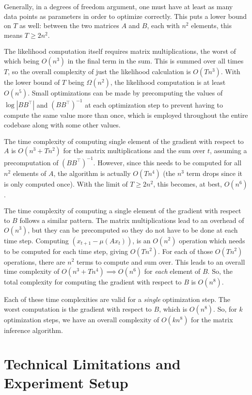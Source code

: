 \documentclass[12pt]{article}
\theoremstyle{definition}
\begin{document}
Generally, in a degrees of freedom argument, one must have at least as many data points as parameters in order to optimize correctly. This puts a lower bound on $T$ as well: between the two matrices $A$ and $B$, each with $n^2$ elements, this means $T \geq 2n^2$.

The likelihood computation itself requires matrix multiplications, the worst of which being $O(n^3)$ in the final term in the sum. This is summed over all times $T$, so the overall complexity of just the likelihood calculation is $O(Tn^3)$. With the lower bound of $T$ being $\Omega(n^2)$, the likelihood computation is at least $O(n^5)$. Small optimizations can be made by precomputing the values of $\log|BB^\top|$ and $(BB^\top)^{-1}$ at each optimization step to prevent having to compute the same value more than once, which is employed throughout the entire codebase along with some other values. 

The time complexity of computing single element of the gradient with respect to $A$ is $O(n^3 + Tn^2)$ for the matrix multiplications and the sum over $t$, assuming a precomputation of $(BB^\top)^{-1}$. However, since this needs to be computed for all $n^2$ elements of $A$, the algorithm is actually $O(Tn^4)$ (the $n^3$ term drops since it is only computed once). With the limit of $T \geq 2n^2$, this becomes, at best, $O(n^6)$.

The time complexity of computing a single element of the gradient with respect to $B$ follows a similar pattern. The matrix multiplications lead to an overhead of $O(n^3)$, but they can be precomputed so they do not have to be done at each time step. Computing $(x_{t+1} - \mu(Ax_t))$, is an $O(n^2)$ operation which needs to be computed for each time step, giving $O(Tn^2)$. For each of those $O(Tn^2)$ operations, there are $n^2$ terms to compute and sum over. This leads to an overall time complexity of $O(n^3 + Tn^4) \implies O(n^6)$ for \textit{each} element of $B$. So, the total complexity for computing the gradient with respect to $B$ is $O(n^8)$.

Each of these time complexities are valid for a \textit{single} optimization step. The worst computation is the gradient with respect to $B$, which is $O(n^8)$. So, for $k$ optimization steps, we have an overall complexity of $O(kn^8)$ for the matrix inference algorithm.

\section{Technical Limitations and Experiment Setup}
\end{document}
